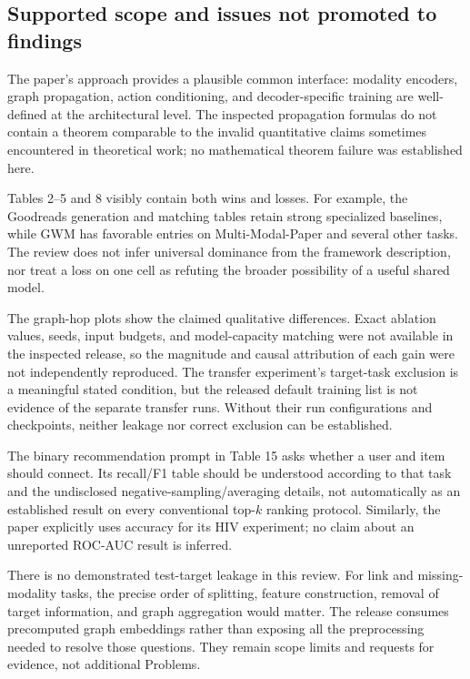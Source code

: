 \documentclass[10pt]{article}
\begin{document}
\subsection*{Supported scope and issues not promoted to findings}
The paper’s approach provides a plausible common interface: modality encoders, graph propagation, action conditioning, and decoder-specific training are well-defined at the architectural level. The inspected propagation formulas do not contain a theorem comparable to the invalid quantitative claims sometimes encountered in theoretical work; no mathematical theorem failure was established here.\par
Tables 2–5 and 8 visibly contain both wins and losses. For example, the Goodreads generation and matching tables retain strong specialized baselines, while GWM has favorable entries on Multi-Modal-Paper and several other tasks. The review does not infer universal dominance from the framework description, nor treat a loss on one cell as refuting the broader possibility of a useful shared model.\par
The graph-hop plots show the claimed qualitative differences. Exact ablation values, seeds, input budgets, and model-capacity matching were not available in the inspected release, so the magnitude and causal attribution of each gain were not independently reproduced. The transfer experiment’s target-task exclusion is a meaningful stated condition, but the released default training list is not evidence of the separate transfer runs. Without their run configurations and checkpoints, neither leakage nor correct exclusion can be established.\par
The binary recommendation prompt in Table 15 asks whether a user and item should connect. Its recall/F1 table should be understood according to that task and the undisclosed negative-sampling/averaging details, not automatically as an established result on every conventional top-\(k\) ranking protocol. Similarly, the paper explicitly uses accuracy for its HIV experiment; no claim about an unreported ROC-AUC result is inferred.\par
There is no demonstrated test-target leakage in this review. For link and missing-modality tasks, the precise order of splitting, feature construction, removal of target information, and graph aggregation would matter. The release consumes precomputed graph embeddings rather than exposing all the preprocessing needed to resolve those questions. They remain scope limits and requests for evidence, not additional Problems.\par
\end{document}
